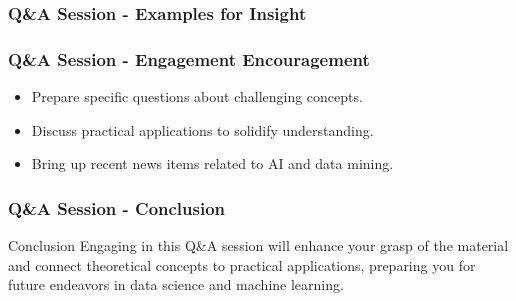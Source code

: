 \documentclass[aspectratio=169]{beamer}
\begin{document}
\begin{frame}[fragile]
    \frametitle{Q\&A Session - Examples for Insight}
\end{frame}

\begin{frame}[fragile]
    \frametitle{Q\&A Session - Engagement Encouragement}
    \begin{itemize}
        \item Prepare specific questions about challenging concepts.
        \item Discuss practical applications to solidify understanding.
        \item Bring up recent news items related to AI and data mining.
    \end{itemize}
\end{frame}

\begin{frame}[fragile]
    \frametitle{Q\&A Session - Conclusion}
    \begin{block}{Conclusion}
        Engaging in this Q\&A session will enhance your grasp of the material and connect theoretical concepts to practical applications, preparing you for future endeavors in data science and machine learning.
    \end{block}
\end{frame}
\end{document}

